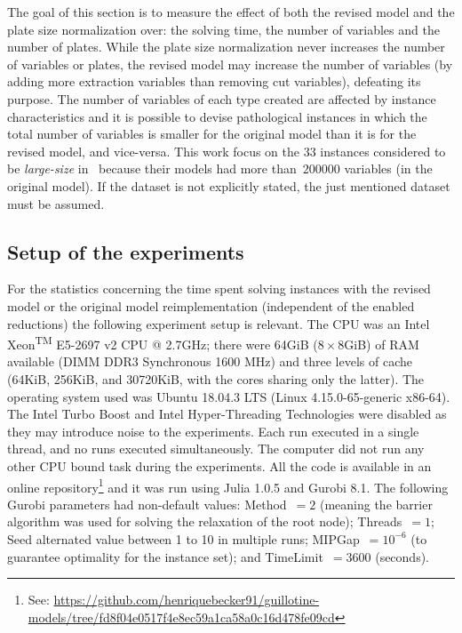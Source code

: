 \documentclass[runningheads]{llncs}
\begin{document}
The goal of this section is to measure the effect of both the revised model and the plate size normalization over: the solving time, the number of variables and the number of plates.
While the plate size normalization never increases the number of variables or plates, the revised model may increase the number of variables (by adding more extraction variables than removing cut variables), defeating its purpose.
The number of variables of each type created are affected by instance characteristics and it is possible to devise pathological instances in which the total number of variables is smaller for the original model than it is for the revised model, and vice-versa.
This work focus on the 33 instances considered to be \emph{large-size} in~\cite{furini:2016} because their models had more than~\(200000\) variables (in the original model).
If the dataset is not explicitly stated, the just mentioned dataset must be assumed.

\subsection{Setup of the experiments}

For the statistics concerning the time spent solving instances with the revised model or the original model reimplementation (independent of the enabled reductions) the following experiment setup is relevant.
The CPU was an Intel\textsuperscript{\textregistered} Xeon\textsuperscript{TM} E5-2697 v2 CPU @ 2.7GHz;
there were 64GiB (\(8 \times 8\)GiB) of RAM available (DIMM DDR3 Synchronous 1600 MHz) and three levels of cache (64KiB, 256KiB, and 30720KiB, with the cores sharing only the latter).
The operating system used was Ubuntu 18.04.3 LTS (Linux 4.15.0-65-generic x86-64).
The Intel\textsuperscript{\textregistered} Turbo Boost and Intel\textsuperscript{\textregistered} Hyper-Threading Technologies were disabled as they may introduce noise to the experiments.
Each run executed in a single thread, and no runs executed simultaneously.
The computer did not run any other CPU bound task during the experiments.
All the code is available in an online repository\footnote{See: \url{https://github.com/henriquebecker91/guillotine-models/tree/fd8f04e0517f4e8ec59a1ca58a0c16d478fe09cd}} and it was run using Julia 1.0.5 and Gurobi 8.1.
The following Gurobi parameters had non-default values: Method~\(= 2\) (meaning the barrier algorithm was used for solving the relaxation of the root node); Threads~\(= 1\); Seed alternated value between 1 to 10 in multiple runs; MIPGap~\(= 10^{-6}\) (to guarantee optimality for the instance set); and TimeLimit~\(= 3600\) (seconds).
\end{document}

